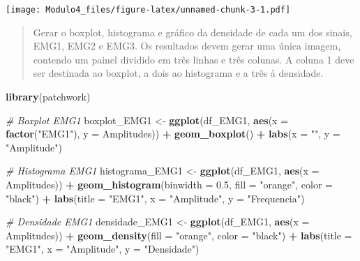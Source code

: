 \documentclass[
]{article}
\newenvironment{Shaded}{\begin{snugshade}}{\end{snugshade}}
\newcommand{\AttributeTok}[1]{\textcolor[rgb]{0.13,0.29,0.53}{#1}}
\newcommand{\CommentTok}[1]{\textcolor[rgb]{0.56,0.35,0.01}{\textit{#1}}}
\newcommand{\FloatTok}[1]{\textcolor[rgb]{0.00,0.00,0.81}{#1}}
\newcommand{\FunctionTok}[1]{\textcolor[rgb]{0.13,0.29,0.53}{\textbf{#1}}}
\newcommand{\NormalTok}[1]{#1}
\newcommand{\OtherTok}[1]{\textcolor[rgb]{0.56,0.35,0.01}{#1}}
\newcommand{\SpecialCharTok}[1]{\textcolor[rgb]{0.81,0.36,0.00}{\textbf{#1}}}
\newcommand{\StringTok}[1]{\textcolor[rgb]{0.31,0.60,0.02}{#1}}
\begin{document}
\texttt{[image: Modulo4\_files/figure-latex/unnamed-chunk-3-1.pdf]}

\begin{quote}
Gerar o boxplot, histograma e gráfico da densidade de cada um dos
sinais, EMG1, EMG2 e EMG3. Os resultados devem gerar uma única imagem,
contendo um painel dividido em três linhas e três colunas. A coluna 1
deve ser destinada ao boxplot, a dois ao histograma e a três à
densidade.
\end{quote}

\begin{Shaded}
\begin{Highlighting}[]
\FunctionTok{library}\NormalTok{(patchwork)}

\CommentTok{\# Boxplot EMG1}
\NormalTok{boxplot\_EMG1 }\OtherTok{\textless{}{-}} \FunctionTok{ggplot}\NormalTok{(df\_EMG1, }\FunctionTok{aes}\NormalTok{(}\AttributeTok{x =} \FunctionTok{factor}\NormalTok{(}\StringTok{"EMG1"}\NormalTok{), }\AttributeTok{y =}\NormalTok{ Amplitudes)) }\SpecialCharTok{+}
  \FunctionTok{geom\_boxplot}\NormalTok{() }\SpecialCharTok{+}
  \FunctionTok{labs}\NormalTok{(}\AttributeTok{x =} \StringTok{""}\NormalTok{, }\AttributeTok{y =} \StringTok{"Amplitude"}\NormalTok{) }

\CommentTok{\# Histograma EMG1}
\NormalTok{histograma\_EMG1 }\OtherTok{\textless{}{-}} \FunctionTok{ggplot}\NormalTok{(df\_EMG1, }\FunctionTok{aes}\NormalTok{(}\AttributeTok{x =}\NormalTok{ Amplitudes)) }\SpecialCharTok{+}
  \FunctionTok{geom\_histogram}\NormalTok{(}\AttributeTok{binwidth =} \FloatTok{0.5}\NormalTok{, }\AttributeTok{fill =} \StringTok{"orange"}\NormalTok{, }\AttributeTok{color =} \StringTok{"black"}\NormalTok{) }\SpecialCharTok{+}
  \FunctionTok{labs}\NormalTok{(}\AttributeTok{title =} \StringTok{"EMG1"}\NormalTok{, }\AttributeTok{x =} \StringTok{"Amplitude"}\NormalTok{, }\AttributeTok{y =} \StringTok{"Frequencia"}\NormalTok{) }

\CommentTok{\# Densidade EMG1}
\NormalTok{densidade\_EMG1 }\OtherTok{\textless{}{-}} \FunctionTok{ggplot}\NormalTok{(df\_EMG1, }\FunctionTok{aes}\NormalTok{(}\AttributeTok{x =}\NormalTok{ Amplitudes)) }\SpecialCharTok{+}
  \FunctionTok{geom\_density}\NormalTok{(}\AttributeTok{fill =} \StringTok{"orange"}\NormalTok{, }\AttributeTok{color =} \StringTok{"black"}\NormalTok{) }\SpecialCharTok{+}
  \FunctionTok{labs}\NormalTok{(}\AttributeTok{title =} \StringTok{"EMG1"}\NormalTok{, }\AttributeTok{x =} \StringTok{"Amplitude"}\NormalTok{, }\AttributeTok{y =} \StringTok{"Densidade"}\NormalTok{)}


\end{Highlighting}
\end{Shaded}
\end{document}
